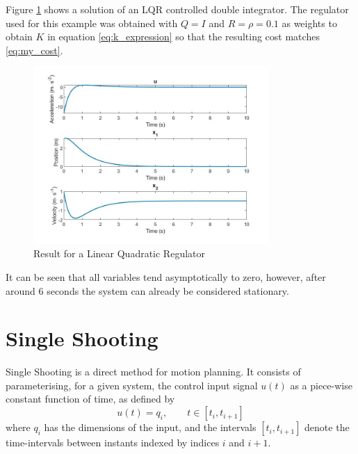 \par Figure \ref{fig:solution_lqr} shows a solution of an LQR controlled double integrator. The regulator used for this example was obtained with $Q = I$ and $R = \rho = 0.1$ as weights to obtain $K$ in equation \ref{eq:k_expression} so that the resulting cost matches \ref{eq:my_cost}.




\begin{figure}[h!]
\centering
\includegraphics[width=0.8\textwidth]{Images/solution_lqr.jpg}
\caption{Result for a Linear Quadratic Regulator}
\label{fig:solution_lqr}
\end{figure}

\par It can be seen that all variables tend asymptotically to zero, however, after around 6 seconds the system can already be considered stationary.



\section{Single Shooting}

\par Single Shooting is a direct method for motion planning. It consists of parameterising, for a given system, the control input signal $u(t)$ as a piece-wise constant function of time, as defined by 
\begin{equation}
    \label{eq:single_shooting}
    u(t) = q_i, \qquad t\in [t_i,t_{i+1}]
\end{equation}
where $q_i$ has the dimensions of the input, and the intervals $[t_i,t_{i+1}]$ denote the time-intervals between instants indexed by indices $i$ and $i+1$.


